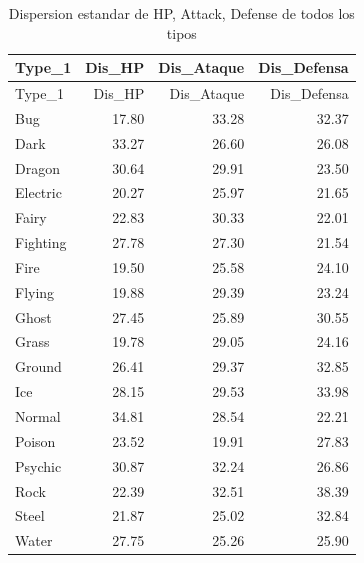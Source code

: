 \documentclass[oneside,11pt]{Latex/Classes/PhDthesisPSnPDF}
\begin{document}
\begin{longtable}[]{@{}lrrr@{}}
\caption{Dispersion estandar de HP, Attack, Defense de todos los
tipos}\tabularnewline
\toprule\noalign{}
Type\_1 & Dis\_HP & Dis\_Ataque & Dis\_Defensa \\
\midrule\noalign{}
\endfirsthead
\toprule\noalign{}
Type\_1 & Dis\_HP & Dis\_Ataque & Dis\_Defensa \\
\midrule\noalign{}
\endhead
\bottomrule\noalign{}
\endlastfoot
Bug & 17.80 & 33.28 & 32.37 \\
Dark & 33.27 & 26.60 & 26.08 \\
Dragon & 30.64 & 29.91 & 23.50 \\
Electric & 20.27 & 25.97 & 21.65 \\
Fairy & 22.83 & 30.33 & 22.01 \\
Fighting & 27.78 & 27.30 & 21.54 \\
Fire & 19.50 & 25.58 & 24.10 \\
Flying & 19.88 & 29.39 & 23.24 \\
Ghost & 27.45 & 25.89 & 30.55 \\
Grass & 19.78 & 29.05 & 24.16 \\
Ground & 26.41 & 29.37 & 32.85 \\
Ice & 28.15 & 29.53 & 33.98 \\
Normal & 34.81 & 28.54 & 22.21 \\
Poison & 23.52 & 19.91 & 27.83 \\
Psychic & 30.87 & 32.24 & 26.86 \\
Rock & 22.39 & 32.51 & 38.39 \\
Steel & 21.87 & 25.02 & 32.84 \\
Water & 27.75 & 25.26 & 25.90 \\
\end{longtable}
\end{document}
